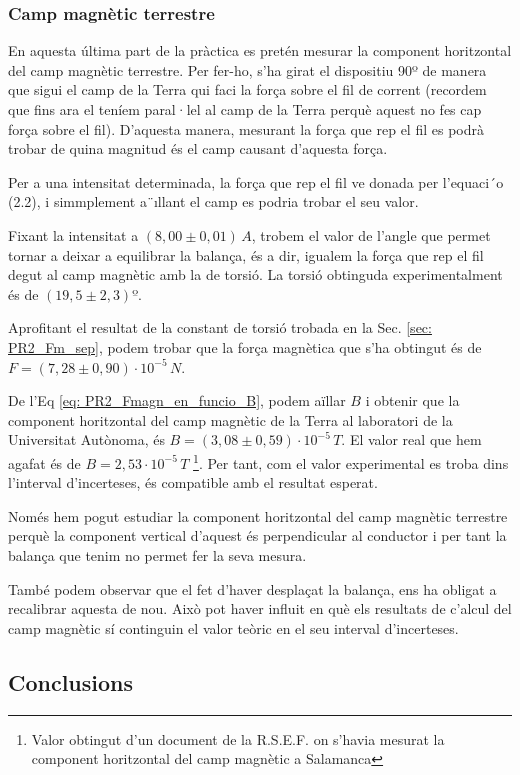 \documentclass[11pt]{article}
\numberwithin{equation}{section}
\numberwithin{figure}{section}
\numberwithin{table}{section}
\begin{document}
\subsubsection{Camp magnètic terrestre}\label{sec: PR2_Bterra}

En aquesta última part de la pràctica es pretén mesurar la component horitzontal del camp magnètic terrestre. Per fer-ho, s’ha girat el dispositiu 90º de manera que sigui el camp de la Terra qui faci la força sobre el fil de corrent (recordem que fins ara el teníem paral·lel al camp de
la Terra perquè aquest no fes cap força sobre el fil). D’aquesta manera, mesurant la força que rep el fil es podrà trobar de quina magnitud és el camp causant d’aquesta força.

Per a una intensitat determinada, la força que rep el fil ve donada per l’equaci´o (2.2), i simmplement a¨ıllant el camp es podria trobar el seu valor. 

Fixant la intensitat a $(8,00 \pm 0,01)\,A$, trobem el valor de l'angle que permet tornar a deixar a equilibrar la balança, és a dir, igualem la força que rep el fil degut al camp magnètic amb la de torsió. La torsió obtinguda experimentalment és de $(19,5 \pm 2,3)º$. 

Aprofitant el resultat de la constant de torsió trobada en la Sec. \ref{sec: PR2_Fm_sep}, podem trobar que la força magnètica que s’ha obtingut és de $F = (7,28 \pm 0,90) \cdot 10^{-5}\,N$. 

De l’Eq \eqref{eq: PR2_Fmagn_en_funcio_B}, podem aïllar $B$ i obtenir que la component horitzontal del camp magnètic de la Terra al laboratori de la Universitat Autònoma, és $B = (3,08 \pm 0,59)·10^{-5}\,T$. El valor real que hem agafat és de $B = 2,53·10^{−5}\,T$ \footnote{Valor obtingut d'un document de la R.S.E.F. on s'havia mesurat la component horitzontal del camp magnètic a Salamanca}. Per tant, com el valor experimental es troba dins l’interval d’incerteses, és compatible amb el resultat esperat.

Només hem pogut estudiar la component horitzontal del camp magnètic terrestre perquè la component vertical d’aquest és perpendicular al conductor i per tant la balança que tenim no permet fer la seva mesura.

També podem observar que el fet d'haver desplaçat la balança, ens ha obligat a recalibrar aquesta de nou. Això pot haver influit en què els resultats de c'alcul del camp magnètic sí continguin el valor teòric en el seu interval d'incerteses.

\subsection{Conclusions}\label{sec: PR2_concl}
\end{document}

